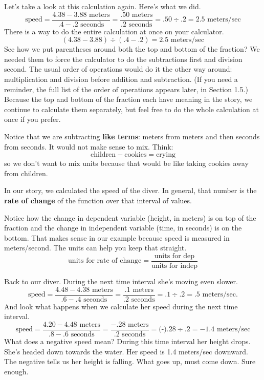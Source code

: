 Let's take a look at this calculation again.  Here's what we did.
$$\text{speed} =  \frac{4.38-3.88 \text{ meters}}{.4-.2 \text{ seconds}} = \frac{.50 \text{ meters}}{.2 \text{ seconds}} = .50 \div .2 = 2.5 \text{ meters/sec}$$
There is a way to do the entire calculation at once on your calculator.
$$(4.38-3.88) \div (.4-.2)=2.5 \text{ meters/sec}$$
See how we put parentheses around both the top and bottom of the fraction?  We needed them to force the calculator to do the subtractions first and division second. The usual order of operations would do it the other way around:  multiplication and division before addition and subtraction.  (If you need a reminder, the full list of the order of operations appears later, in Section 1.5.)  Because the top and bottom of the fraction each have meaning in the story, we continue to calculate them separately, but feel free to do the whole calculation at once if you prefer.

Notice that we are subtracting \textbf{like terms}:  meters from meters and then seconds from seconds.  It would not make sense to  mix.  Think:  $$\text{children} -  \text{cookies} = \text{crying}$$
so we don't want to mix units because that would be like taking cookies away from children.

In our story, we calculated the speed of the diver.  In general, that number is the \textbf{rate of change} of the function over that interval of values.  

\bigskip
\bigskip

\noindent Notice how the change in dependent variable (height, in meters) is on top of the fraction and the change in independent variable (time, in seconds) is on the bottom.  That makes sense in our example because speed is measured in meters/second.  The units can help you keep that straight.
$$\text{units for rate of change} = \frac{\text{units for dep}}{\text{units for indep}}$$

Back to our diver.  During the next time interval she's moving even slower.  
$$\text{speed} = \frac{4.48-4.38 \text{ meters}}{.6-.4 \text{ seconds}}= \frac{.1 \text{ meters}}{.2 \text{ seconds}} = .1 \div .2 = .5 \text{ meters/sec.}$$  
And look what happens when we calculate her speed during the next time interval.  
$$\text{speed} = \frac{4.20-4.48 \text{ meters}}{.8-.6 \text{ seconds}} =  \frac{-.28 \text{ meters}}{.2 \text{ seconds}} = \text{(-)}.28 \div .2 = -1.4 \text{ meters/sec}$$  What does a negative speed mean?  During this time interval her height drops.  She's headed down towards the water.  Her speed is 1.4 meters/sec downward.  The negative tells us her height is falling.  What goes up, must come down.  Sure enough.

